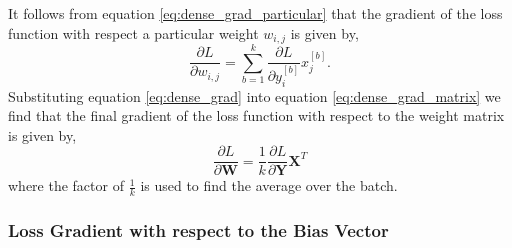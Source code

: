 \documentclass[twocolumn,pra,floatfix]{revtex4-2}
\begin{document}
                It follows from equation \ref{eq:dense_grad_particular} that the gradient of the loss function with respect a particular weight $w_{i,j}$ is given by,
                \begin{equation}
                    \frac{\partial L}{\partial w_{i,j}} = \sum_{b=1}^{k} \frac{\partial L}{\partial y^{[b]}_i} x_j^{[b]}.
                    \label{eq:dense_grad}
                \end{equation}
                Substituting equation \ref{eq:dense_grad} into equation \ref{eq:dense_grad_matrix} we find that the final gradient of the loss function with respect to the weight matrix is given by,
                \begin{equation}
                    \frac{\partial L}{\partial \mathbf{W}} = \frac{1}{k}\frac{\partial L}{\partial \mathbf{Y}} \mathbf{X}^T\label{eq:dldw}
                \end{equation}
                where the factor of $\frac{1}{k}$ is used to find the average over the batch.
            \subsubsection{Loss Gradient with respect to the Bias Vector}
\end{document}
